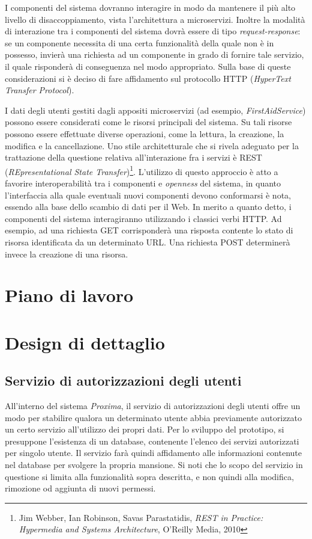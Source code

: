 \documentclass[a4paper,12pt]{report}
\begin{document}
I componenti del sistema dovranno interagire in modo da mantenere il più alto livello di disaccoppiamento, vista l'architettura a microservizi. Inoltre la modalità di interazione tra i componenti del sistema dovrà essere di tipo \emph{request-response}: se un componente necessita di una certa funzionalità della quale non è in possesso, invierà una richiesta ad un componente in grado di fornire tale servizio, il quale risponderà di conseguenza nel modo appropriato. Sulla base di queste considerazioni si è deciso di fare affidamento sul protocollo HTTP (\emph{HyperText Transfer Protocol}).

I dati degli utenti gestiti dagli appositi microservizi (ad esempio, \emph{FirstAidService}) possono essere considerati come le risorsi principali del sistema. Su tali risorse possono essere effettuate diverse operazioni, come la lettura, la creazione, la modifica e la cancellazione. Uno stile architetturale che si rivela adeguato per la trattazione della questione relativa all'interazione fra i servizi è REST (\emph{REpresentational State Transfer})\footnote{Jim Webber, Ian Robinson, Savas Parastatidis, {\em REST in Practice: Hypermedia and Systems Architecture}, O'Reilly Media, 2010}. L'utilizzo di questo approccio è atto a favorire interoperabilità tra i componenti e \emph{openness} del sistema, in quanto l'interfaccia alla quale eventuali nuovi componenti devono conformarsi è nota, essendo alla base dello scambio di dati per il Web.
In merito a quanto detto, i componenti del sistema interagiranno utilizzando i classici verbi HTTP. Ad esempio, ad una richiesta GET corrisponderà una risposta contente lo stato di risorsa identificata da un determinato URL. Una richiesta POST determinerà invece la creazione di una risorsa.


\chapter{Piano di lavoro}

\chapter{Design di dettaglio}

\section{Servizio di autorizzazioni degli utenti} \label{users_authorizations_design}

All'interno del sistema \emph{Proxima}, il servizio di autorizzazioni degli utenti offre un modo per stabilire qualora un determinato utente abbia previamente autorizzato un certo servizio all'utilizzo dei propri dati. Per lo sviluppo del prototipo, si presuppone l'esistenza di un database, contenente l'elenco dei servizi autorizzati per singolo utente. Il servizio farà quindi affidamento alle informazioni contenute nel database per svolgere la propria mansione. Si noti che lo scopo del servizio in questione si limita alla funzionalità sopra descritta, e non quindi alla modifica, rimozione od aggiunta di nuovi permessi. 
\end{document}
